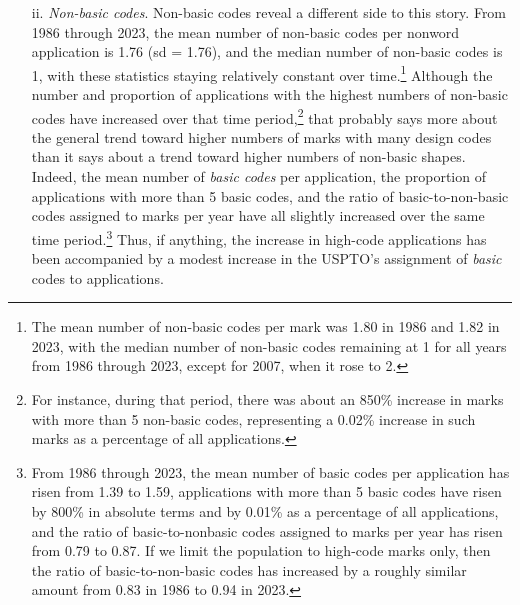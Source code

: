 \documentclass[letterpaper, 11pt, oneside]{article}
\begin{document}
\begin{enumerate}
\item[ii.] \textit{Non-basic codes}. Non-basic codes reveal a different side to this story. From 1986 through 2023, the mean number of non-basic codes per nonword application is 1.76 (sd = 1.76), and the median number of non-basic codes is 1, with these statistics staying relatively constant over time.\footnote{The mean number of non-basic codes per mark was 1.80 in 1986 and 1.82 in 2023, with the median number of non-basic codes remaining at 1 for all years from 1986 through 2023, except for 2007, when it rose to 2.} Although the number and proportion of applications with the highest numbers of non-basic codes have increased over that time period,\footnote{For instance, during that period, there was about an 850\% increase in marks with more than 5 non-basic codes, representing a 0.02\% increase in such marks as a percentage of all applications.} that probably says more about the general trend toward higher numbers of marks with many design codes than it says about a trend toward higher numbers of non-basic shapes. Indeed, the mean number of \textit{basic codes} per application, the proportion of applications with more than 5 basic codes, and the ratio of basic-to-non-basic codes assigned to marks per year have all slightly increased over the same time period.\footnote{From 1986 through 2023, the mean number of basic codes per application has risen from 1.39 to 1.59, applications with more than 5 basic codes have risen by 800\% in absolute terms and by 0.01\% as a percentage of all applications, and the ratio of basic-to-nonbasic codes assigned to marks per year has risen from 0.79 to 0.87. If we limit the population to high-code marks only, then the ratio of basic-to-non-basic codes has increased by a roughly similar amount from 0.83 in 1986 to 0.94 in 2023.} Thus, if anything, the increase in high-code applications has been accompanied by a modest increase in the USPTO's assignment of \textit{basic} codes to applications.


\end{enumerate}
\end{document}
